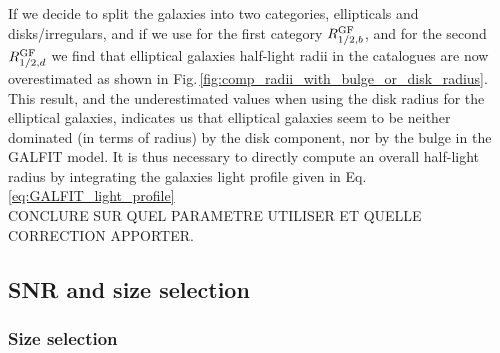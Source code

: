 If we decide to split the galaxies into two categories, ellipticals and disks/irregulars, and if we use for the first category $R_{1/2 , b}^{\rm{GF}}$, and for the second $R_{1/2 , d}^{\rm{GF}}$ we find that elliptical galaxies half-light radii in the catalogues are now overestimated as shown in Fig.\,\ref{fig:comp_radii_with_bulge_or_disk_radius}. This result, and the underestimated values when using the disk radius for the elliptical galaxies, indicates us that elliptical galaxies seem to be neither dominated (in terms of radius) by the disk component, nor by the bulge in the GALFIT model. It is thus necessary to directly compute an overall half-light radius by integrating the galaxies light profile given in Eq.\,\ref{eq:GALFIT_light_profile} \\


CONCLURE SUR QUEL PARAMETRE UTILISER ET QUELLE CORRECTION APPORTER.























\subsection{SNR and size selection}
\label{sec:cut}

\subsubsection{Size selection}
\label{sec:cut_size}

